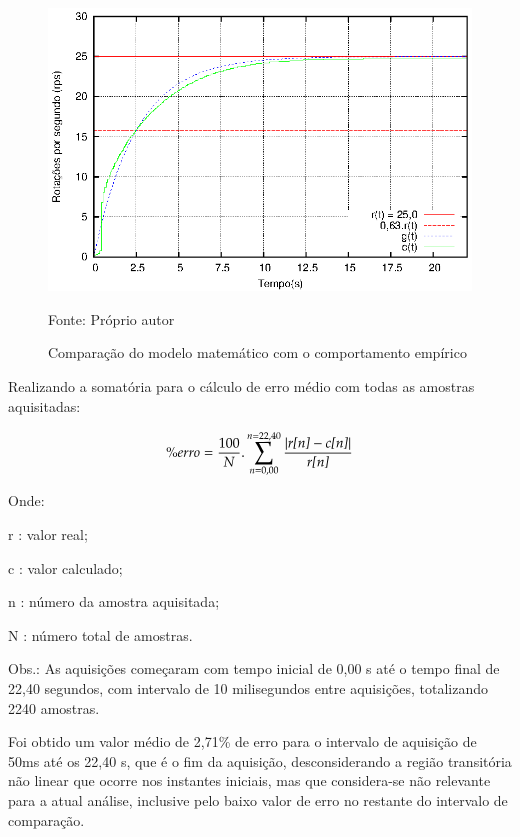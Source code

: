 \begin{figure}[!htb]
\centering
\caption{Comparação do modelo matemático com o comportamento empírico}
\center\includegraphics[scale=1.3]{./plot/acaoMalhaAbertaTau.eps}

\label{fig:resultadoMalhaAberta}

{\small Fonte: Próprio autor}
\end{figure}

Realizando a somatória para o cálculo de erro médio com todas as amostras aquisitadas: 

\begin{equation}
 \% erro = \frac{100}{N} . \sum_{n = 0,00}^{n=22,40} {\frac{| \text{\emph{r[n]}} -\text{\emph{c[n]}} |}{\text{\emph{r[n]}}} } 
\end{equation}


Onde:

\setlength{\parindent}{2cm}
r : valor real; 

c : valor calculado;

n : número da amostra aquisitada;

N : número total de amostras.

Obs.: As aquisições começaram com tempo inicial de 0,00 s até o tempo final de 22,40 segundos, com intervalo de 10 milisegundos entre aquisições, totalizando 2240 amostras.

\setlength{\parindent}{1cm}


Foi obtido um valor médio de 2,71\% de erro 
para o intervalo de aquisição de 50ms até os 22,40 s, 
que é o fim da aquisição, 
desconsiderando a região transitória não linear 
que ocorre nos instantes iniciais, 
mas que considera-se não relevante para a atual análise, 
inclusive pelo baixo valor de erro no restante do intervalo de comparação.


